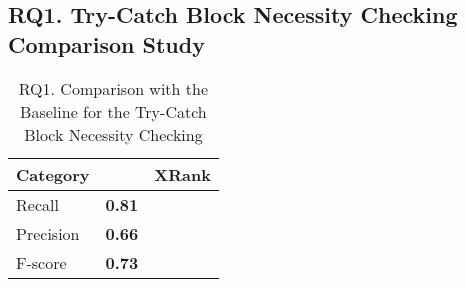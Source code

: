 \subsection{RQ1. Try-Catch Block Necessity Checking Comparison Study}
\label{sec:rq1}

\begin{table}[h]
	\caption{RQ1. Comparison with the Baseline for the Try-Catch Block Necessity Checking}
	\begin{center}
		\renewcommand{\arraystretch}{1}
		\begin{tabular}{p{2cm}<{\centering}p{2.5cm}<{\centering}p{2.5cm}<{\centering}}
			\hline
			Category  & \tool  & XRank \\
			\hline
			Recall    & \textbf{0.81} & \\
			Precision & \textbf{0.66} & \\
			F-score   & \textbf{0.73} & \\
			\hline
		\end{tabular}
		\label{RQ1_results}
	\end{center}
\end{table}

{\color{red}{This section waiting for the XRank Results. But from the current estimate, our approach should have higher F-score. But the recall and precision I'm not sure. Once I have the results, I will update this section.}}